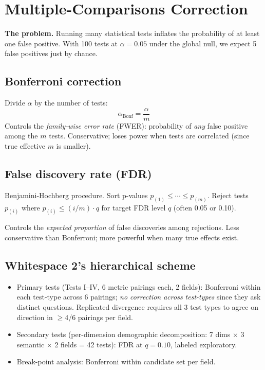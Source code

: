 \documentclass[11pt]{article}
\begin{document}
\section{Multiple-Comparisons Correction}
\label{sec:multiple-comparisons}

\textbf{The problem.} Running many statistical tests inflates the
probability of at least one false positive. With 100 tests at
$\alpha = 0.05$ under the global null, we expect 5 false positives
just by chance.

\subsection{Bonferroni correction}

Divide $\alpha$ by the number of tests:
\[
  \alpha_{\text{Bonf}} = \frac{\alpha}{m}
\]
Controls the \textit{family-wise error rate} (FWER): probability of
\textit{any} false positive among the $m$ tests. Conservative; loses
power when tests are correlated (since true effective $m$ is smaller).

\subsection{False discovery rate (FDR)}

Benjamini-Hochberg procedure. Sort p-values
$p_{(1)} \le \cdots \le p_{(m)}$. Reject tests $p_{(i)}$ where
$p_{(i)} \le (i/m) \cdot q$ for target FDR level $q$ (often 0.05 or 0.10).

Controls the \textit{expected proportion} of false discoveries among
rejections. Less conservative than Bonferroni; more powerful when
many true effects exist.

\subsection{Whitespace 2's hierarchical scheme}

\begin{itemize}[nosep]
  \item Primary tests (Tests I--IV, 6 metric pairings each, 2 fields):
    Bonferroni within each test-type across 6 pairings;
    \textit{no correction across test-types} since they ask distinct
    questions. Replicated divergence requires all 3 test types to agree
    on direction in $\ge$4/6 pairings per field.
  \item Secondary tests (per-dimension demographic decomposition:
    7 dims $\times$ 3 semantic $\times$ 2 fields = 42 tests): FDR at
    $q = 0.10$, labeled exploratory.
  \item Break-point analysis: Bonferroni within candidate set per field.
\end{itemize}
\end{document}
